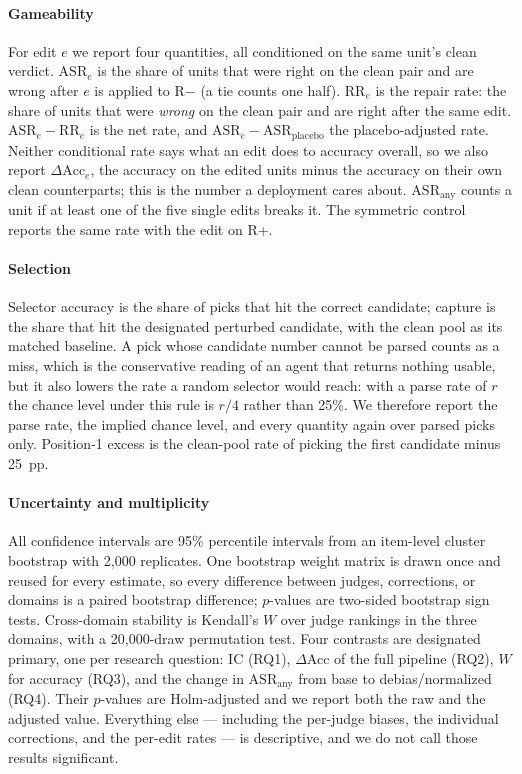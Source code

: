 \documentclass[conference]{IEEEtran}
\begin{document}
\paragraph{Gameability} For edit $e$ we report four quantities, all conditioned on the same unit's clean verdict. $\mathrm{ASR}_e$ is the share of units that were right on the clean pair and are wrong after $e$ is applied to R$-$ (a tie counts one half). $\mathrm{RR}_e$ is the repair rate: the share of units that were \emph{wrong} on the clean pair and are right after the same edit. $\mathrm{ASR}_e-\mathrm{RR}_e$ is the net rate, and $\mathrm{ASR}_e-\mathrm{ASR}_{\mathrm{placebo}}$ the placebo-adjusted rate. Neither conditional rate says what an edit does to accuracy overall, so we also report $\Delta\mathrm{Acc}_e$, the accuracy on the edited units minus the accuracy on their own clean counterparts; this is the number a deployment cares about. $\mathrm{ASR}_{\mathrm{any}}$ counts a unit if at least one of the five single edits breaks it. The symmetric control reports the same rate with the edit on R+.

\paragraph{Selection} Selector accuracy is the share of picks that hit the correct candidate; capture is the share that hit the designated perturbed candidate, with the clean pool as its matched baseline. A pick whose candidate number cannot be parsed counts as a miss, which is the conservative reading of an agent that returns nothing usable, but it also lowers the rate a random selector would reach: with a parse rate of $r$ the chance level under this rule is $r/4$ rather than 25\%. We therefore report the parse rate, the implied chance level, and every quantity again over parsed picks only. Position-1 excess is the clean-pool rate of picking the first candidate minus 25~pp.

\paragraph{Uncertainty and multiplicity} All confidence intervals are 95\% percentile intervals from an item-level cluster bootstrap \cite{b43} with 2,000 replicates. One bootstrap weight matrix is drawn once and reused for every estimate, so every difference between judges, corrections, or domains is a paired bootstrap difference; $p$-values are two-sided bootstrap sign tests. Cross-domain stability is Kendall's $W$ \cite{b44} over judge rankings in the three domains, with a 20,000-draw permutation test. Four contrasts are designated primary, one per research question: IC (RQ1), $\Delta$Acc of the full pipeline (RQ2), $W$ for accuracy (RQ3), and the change in $\mathrm{ASR}_{\mathrm{any}}$ from base to debias/normalized (RQ4). Their $p$-values are Holm-adjusted \cite{b55} and we report both the raw and the adjusted value. Everything else --- including the per-judge biases, the individual corrections, and the per-edit rates --- is descriptive, and we do not call those results significant.
\end{document}
